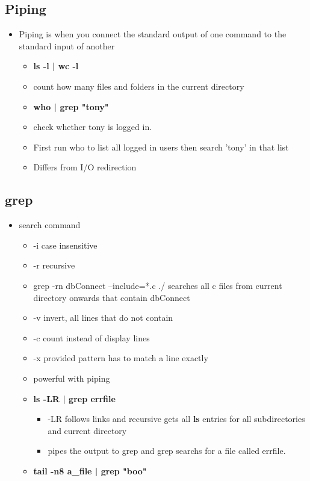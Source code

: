 \documentclass{article}
\begin{document}
\subsection*{Piping}
\begin{itemize}
  \item Piping is when you connect the standard output of one command to the standard input of another
  \begin{itemize}
    \item \textbf{ls -l | wc -l}
    \item count how many files and folders in the current directory
    \item \textbf{who | grep "tony"}
    \item check whether tony is logged in.
    \item First run who to list all logged in users then search 'tony' in that list
    \item Differs from I/O redirection
  \end{itemize}
\end{itemize}
\subsection*{grep}
\begin{itemize}
  \item search command
  \begin{itemize}
    \item -i case insensitive
    \item -r recursive
    \item grep -rn dbConnect --include=*.c ./ searches all c files from current directory onwards that contain dbConnect
    \item -v invert, all lines that do not contain
    \item -c count instead of display lines
    \item -x provided pattern has to match a line exactly
    \item powerful with piping
    \item \textbf{ls -LR | grep errfile}
    \begin{itemize}
      \item -LR follows links and recursive gets all \textbf{ls} entries for all subdirectories and current directory
      \item pipes the output to grep and grep searchs for a file called errfile.
    \end{itemize}
      \item \textbf{tail -n8 a\_file | grep "boo"}
  \end{itemize}
\end{itemize}
\end{document}
